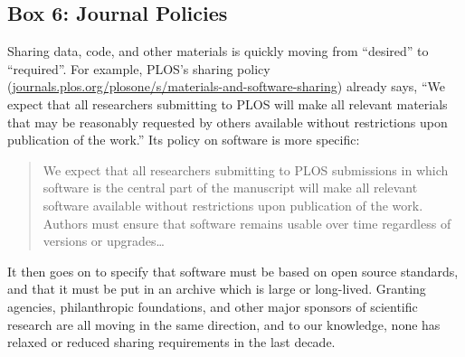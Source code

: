 \subsection{Box 6: Journal Policies}

Sharing data, code, and other materials is quickly moving from ``desired'' to ``required''.
For example, PLOS's sharing policy (\href{http://journals.plos.org/plosone/s/materials-and-software-sharing}{journals.plos.org/plosone/s/materials-and-software-sharing})
already says, ``We expect that all researchers submitting to PLOS will make all relevant materials that may be reasonably requested by others available without restrictions upon publication of the work.''
Its policy on software is more specific:

\begin{quote}
We expect that all researchers submitting to PLOS submissions in which software is the central part of the manuscript will make all relevant software available without restrictions upon publication of the work. Authors must ensure that software remains usable over time regardless of versions or upgrades\ldots
\end{quote}

It then goes on to specify that software must be based on open source standards,
and that it must be put in an archive which is large or long-lived.
Granting agencies, philanthropic foundations, and other major sponsors of scientific research are all moving in the same direction,
and to our knowledge,
none has relaxed or reduced sharing requirements in the last decade.
